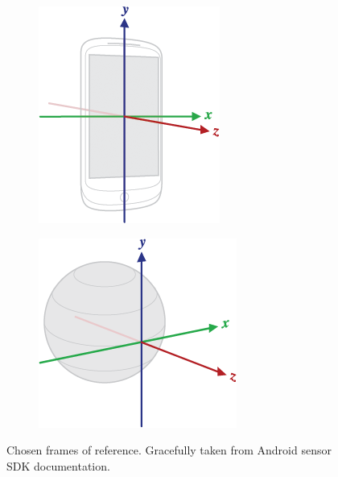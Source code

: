 \begin{figure}[hbt!]
    \centering
    \begin{subfigure}{0.4\textwidth}
        \includegraphics[height=1.0\linewidth]{figures/coords_phone.png}
    \end{subfigure}
    \begin{subfigure}{0.4\textwidth}
        \includegraphics[height=1.0\linewidth]{figures/coords_global.png}
    \end{subfigure}
    \caption{Chosen frames of reference. Gracefully taken from Android sensor SDK documentation.\cite{android_sdk_sensorevent}}
    \label{fig:coords}
\end{figure}

